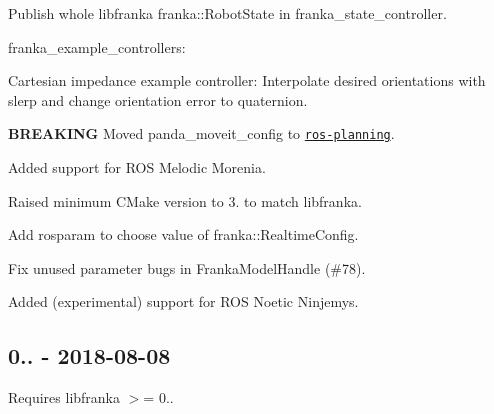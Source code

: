 \begin{DoxyItemize}
\begin{DoxyItemize}
\item Publish whole {\ttfamily libfranka} {\ttfamily franka\+::\+Robot\+State} in {\ttfamily franka\+\_\+state\+\_\+controller}.
\end{DoxyItemize}
\item {\ttfamily franka\+\_\+example\+\_\+controllers}\+:
\begin{DoxyItemize}
\item Cartesian impedance example controller\+: Interpolate desired orientations with slerp and change orientation error to quaternion.
\end{DoxyItemize}
\item {\bfseries B\+R\+E\+A\+K\+I\+NG} Moved {\ttfamily panda\+\_\+moveit\+\_\+config} to \href{https://github.com/ros-planning/panda_moveit_config}{\tt {\ttfamily ros-\/planning}}.
\item Added support for R\+OS Melodic Morenia.
\item Raised minimum C\+Make version to 3. to match {\ttfamily libfranka}.
\item Add rosparam to choose value of {\ttfamily franka\+::\+Realtime\+Config}.
\item Fix unused parameter bugs in {\ttfamily Franka\+Model\+Handle} (\#78).
\item Added (experimental) support for R\+OS Noetic Ninjemys.
\end{DoxyItemize}

\subsection*{0.. -\/ 2018-\/08-\/08}

Requires {\ttfamily libfranka} $>$= 0..


